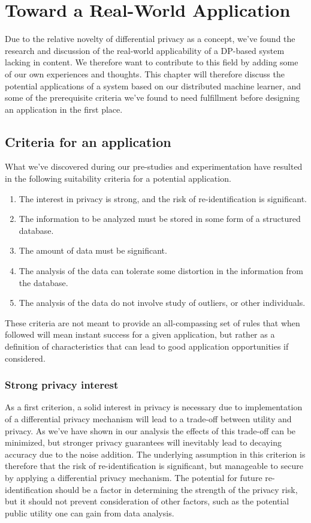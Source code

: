 \chapter{Toward a Real-World Application} \label{ch:RW_application}
Due to the relative novelty of differential privacy as a concept, we've found the research and discussion of the real-world applicability of a DP-based system lacking in content. We therefore want to contribute to this field by adding some of our own experiences and thoughts.  This chapter will therefore discuss the potential applications of a system based on our distributed machine learner, and some of the prerequisite criteria we've found to need fulfillment before designing an application in the first place.   

\section{Criteria for an application} \label{sec:suitability_criteria}
What we've discovered during our pre-studies and experimentation have resulted in the following suitability criteria for a potential application. 
\begin{enumerate}
	\item The interest in privacy is strong, and the risk of re-identification is significant.
	\item The information to be analyzed must be stored in some form of a structured database.
	\item The amount of data must be significant.
	\item The analysis of the data can tolerate some distortion in the information from the database.
	\item The analysis of the data do not involve study of outliers, or other individuals.
\end{enumerate}
These criteria are not meant to provide an all-compassing set of rules that when followed will mean instant success for a given application, but rather as a definition of characteristics that can lead to good application opportunities if considered.  

\subsection{Strong privacy interest}
As a first criterion, a solid interest in privacy is necessary due to implementation of a differential privacy mechanism will lead to a trade-off between utility and privacy. As we've have shown in our analysis the effects of this trade-off can be minimized, but stronger privacy guarantees will inevitably lead to decaying accuracy due to the noise addition. The underlying assumption in this criterion is therefore that the risk of re-identification is significant, but manageable to secure by applying a differential privacy mechanism. The potential for future re-identification should be a factor in determining the strength of the privacy risk, but it should not prevent consideration of other factors, such as the potential public utility one can gain from data analysis.

